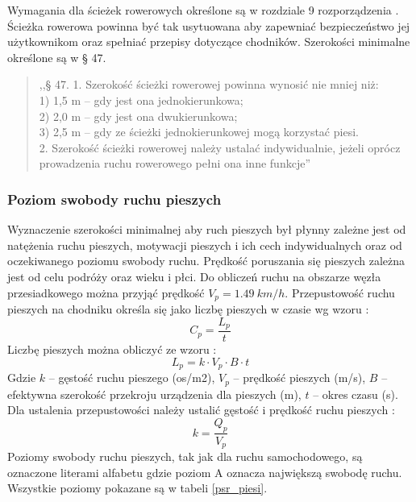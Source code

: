 \documentclass[twoside,12pt]{article}
\begin{document}
	 Wymagania dla ścieżek rowerowych określone są w rozdziale 9 rozporządzenia \cite{rozporzadzenie_drogi}. Ścieżka rowerowa powinna być tak usytuowana aby zapewniać bezpieczeństwo jej użytkownikom oraz spełniać przepisy dotyczące chodników. Szerokości minimalne określone są w § 47.
	 \begin{quote}
	  ,,§ 47. 1. Szerokość ścieżki rowerowej powinna wynosić nie mniej niż:\\
1) 1,5 m – gdy jest ona jednokierunkowa;\\
2) 2,0 m – gdy jest ona dwukierunkowa;\\
3) 2,5 m – gdy ze ścieżki jednokierunkowej mogą korzystać piesi.\\
2. Szerokość ścieżki rowerowej należy ustalać indywidualnie, jeżeli oprócz prowadzenia ruchu rowerowego pełni ona
inne funkcje'' \cite{rozporzadzenie_drogi}
	 \end{quote}
	 
	 \subsubsection{Poziom swobody ruchu pieszych}
	 
	 Wyznaczenie szerokości minimalnej aby ruch pieszych był płynny zależne jest od natężenia ruchu pieszych, motywacji pieszych i ich cech indywidualnych oraz od oczekiwanego poziomu swobody ruchu. Prędkość poruszania się pieszych zależna jest od celu podróży oraz wieku i płci. Do obliczeń ruchu na obszarze węzła przesiadkowego można przyjąć prędkość $V_p = 1.49 \ \si{km/h}$. Przepustowość ruchu pieszych na chodniku określa się jako liczbę pieszych w czasie wg wzoru \cite{standardy_wroclaw}:
	 \begin{equation}
	 C_p = \frac{L_p}{t}
	 \end{equation}
	 Liczbę pieszych można obliczyć ze wzoru \cite{standardy_wroclaw}:
	 \begin{equation}
	 L_p = k \cdot V_p \cdot B \cdot t
	 \end{equation}
	 Gdzie $k$ -- gęstość ruchu pieszego (os/m2), $V_p$ -- prędkość pieszych (m/s), $B$ -- efektywna szerokość przekroju urządzenia dla pieszych (m), $t$ -- okres czasu (s). 
	 Dla ustalenia przepustowości należy ustalić gęstość i prędkość ruchu pieszych \cite{standardy_wroclaw}:
	 \begin{equation}
	 k=\frac{Q_p}{V_p}
	 \end{equation}
	 Poziomy swobody ruchu pieszych, tak jak dla ruchu samochodowego, są oznaczone literami alfabetu gdzie poziom A oznacza największą swobodę ruchu. Wszystkie poziomy pokazane są w tabeli \ref{psr_piesi}.
	 
	 
\end{document}
